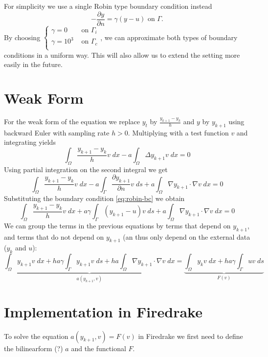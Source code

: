\documentclass[
12pt, %
a4paper, %
onecolumn, %
portrait %
]{article}
\begin{document}
For simplicity we use a single Robin type boundary condition instead
\begin{equation}
- \frac{\partial y}{\partial n} = \gamma (y - u) \text{ on } \Gamma.
\label{eq:robin-bc}
\end{equation}
By choosing 
$\begin{cases}
 \gamma = 0 &\text{ on } \Gamma_i \\ 
\gamma = 10^{3} &\text{ on } \Gamma_c \\
\end{cases}
$,
we can approximate both types of boundary conditions in a uniform way.
This will also allow us to extend the setting more easily in the future.
\section{Weak Form}
For the weak form of the equation we replace $y_t$ by $\frac{y_{k+1} - y_k}{h}$ and $y$ by $y_{k+1}$ using backward Euler with sampling rate $h > 0$. Multiplying with a test function $v$ and integrating yields
\begin{equation}
\int_{\Omega} \frac{y_{k+1} - y_k}{h} v \; dx - a \int_{\Omega} \Delta y_{k+1} v \; dx = 0
\end{equation}
Using partial integration on the second integral we get
\begin{equation}
\int_{\Omega} \frac{y_{k+1} - y_k}{h} v \; dx - a \int_{\Gamma} \frac{\partial y_{k+1}}{\partial n} v \; ds + a \int_{\Omega} \nabla y_{k+1} \cdot \nabla v \; dx = 0
\end{equation}
Substituting the boundary condition \eqref{eq:robin-bc} we obtain
\begin{equation}
\int_{\Omega} \frac{y_{k+1} - y_k}{h} v \; dx + a \gamma \int_{\Gamma}  (y_{k+1} - u) v \; ds + a \int_{\Omega} \nabla y_{k+1} \cdot \nabla v \; dx = 0
\end{equation}
We can group the terms in the previous equations by terms that depend on $y_{k+1}$, and terms that do not depend on $y_{k+1}$ (an thus only depend on the external data ($y_k$ and $u$):
\begin{equation}
\underbrace{
\int_{\Omega} y_{k+1} v \; dx + h a \gamma \int_{\Gamma} y_{k+1} v \; ds + h a \int_{\Omega} \nabla y_{k+1} \cdot \nabla v \; dx
}_{a(y_{k+1}, v)}
 = 
\underbrace{ 
\int_{\Omega} y_k v \; dx + h a \gamma \int_{\Gamma} u v \; ds
}_{F(v)}
\end{equation}

\section{Implementation in Firedrake}
To solve the equation $a(y_{k+1}, v) = F(v)$ in Firedrake we first need to define the bilinearform (?) $a$ and the functional $F$.
\end{document}
